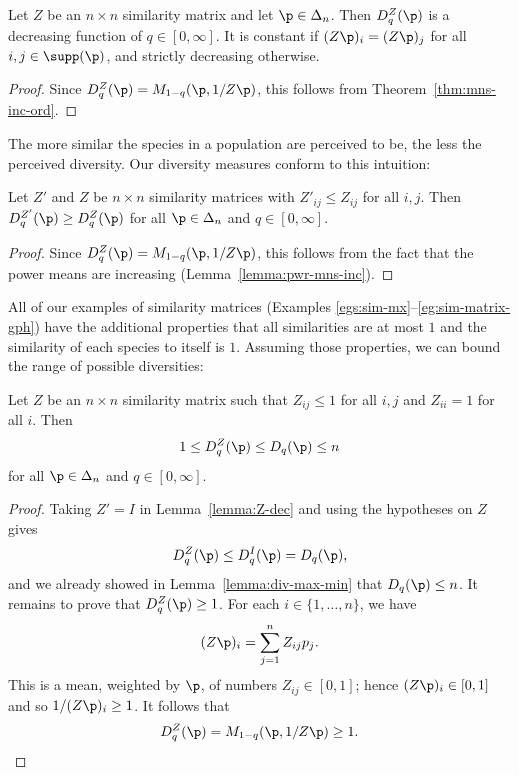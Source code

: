 \begin{propn}
Let $Z$ be an $n \times n$ similarity matrix and let $\p \in \Delta_n$.
Then $D_q^Z(\p)$ is a decreasing%
% 
% 
function of $q \in [0, \infty]$.  It is constant if $(Z\p)_i = (Z\p)_j$ for
all $i, j \in \supp(\p)$, and strictly decreasing otherwise.
\end{propn}

\begin{proof}
Since $D_q^Z(\p) = M_{1 - q}(\p, 1/Z\p)$, this follows from
Theorem~\ref{thm:mns-inc-ord}. 
\end{proof}

The more similar the species in a population are perceived to be, the less
the perceived diversity.  Our diversity measures conform to this intuition:

\begin{lemma}
Let $Z'$ and $Z$ be $n \times n$ similarity matrices with $Z'_{ij} \leq
Z_{ij}$ for all $i, j$.  Then $D_q^{Z'}(\p) \geq D_q^Z(\p)$ for all $\p \in
\Delta_n$ and $q \in [0, \infty]$.
\end{lemma}

\begin{proof}
Since $D_q^Z(\p) = M_{1 - q}(\p, 1/Z\p)$, this follows from the fact that
the power means are increasing (Lemma~\ref{lemma:pwr-mns-inc}).
\end{proof}

All of our examples of similarity matrices (Examples
\ref{egs:sim-mx}--\ref{eg:sim-matrix-gph}) have the additional properties
that all similarities are at most $1$ and the similarity of each species to
itself is $1$.  Assuming those properties, we can bound the range of
possible diversities:

\begin{lemma}[Range]
%
% 
Let $Z$ be an $n \times n$ similarity matrix such that $Z_{ij} \leq 1$ for
all $i, j$ and $Z_{ii} = 1$ for all $i$.  Then
\[
1 \leq D_q^Z(\p) \leq D_q(\p) \leq n
\]
for all $\p \in \Delta_n$ and $q \in [0, \infty]$.
\end{lemma}

\begin{proof}
Taking $Z' = I$ in Lemma~\ref{lemma:Z-dec} and using the hypotheses on $Z$
gives 
\[
D_q^Z(\p) \leq D_q^I(\p) = D_q(\p),
\]
and we already showed in Lemma~\ref{lemma:div-max-min}
that $D_q(\p) \leq n$.  It remains to prove that $D_q^Z(\p) \geq 1$.  For
each $i \in \{1, \ldots, n\}$, we have
\[
(Z\p)_i = \sum_{j = 1}^n Z_{ij} p_j.
\]
This is a mean, weighted by $\p$, of numbers $Z_{ij} \in [0, 1]$; hence
$(Z\p)_i \in [0, 1]$ and so $1/(Z\p)_i \geq 1$.  It follows that
\[
D_q^Z(\p) = M_{1 - q}(\p, 1/Z\p) \geq 1.
\]
\end{proof}

